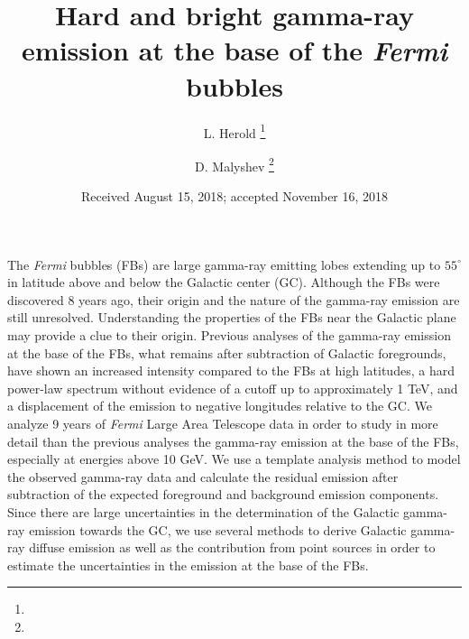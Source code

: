 \documentclass[preprint]{aa}
\newcommand{\Fermi}{\textsl{Fermi}\xspace}
\begin{document}
 


   \title{Hard and bright gamma-ray emission at the base of the \Fermi bubbles}



   \author{L. Herold \thanks{}
          \and
          D. Malyshev \thanks{}
          }


   \date{Received August 15, 2018; accepted November 16, 2018}

 
\abstract
{The \Fermi bubbles (FBs) are large gamma-ray emitting lobes extending up to $55^\circ$ in latitude above and below the Galactic center (GC).
Although the FBs were discovered 8 years ago, their origin and the nature of the gamma-ray emission are still unresolved.
Understanding the properties of the FBs near the Galactic plane may provide a clue to their origin.
Previous analyses of the gamma-ray emission at the base of the FBs, what remains after subtraction of Galactic foregrounds,
have shown an increased intensity compared to the FBs at high latitudes,
a hard power-law spectrum
without evidence of a cutoff up to approximately 1 TeV,
and a displacement of the emission to negative longitudes relative to the GC.
}
{We analyze 9 years of  \Fermi Large Area Telescope data in order to study in more detail than the previous analyses
the gamma-ray emission at the base of the FBs,
especially at energies above 10 GeV.
}
{ We use a template analysis method to model the observed gamma-ray data
and calculate the residual emission after subtraction of the expected foreground and background emission components.
Since there are large uncertainties in the determination of the Galactic gamma-ray emission towards the GC,
we use several methods to derive Galactic gamma-ray diffuse emission as well as the contribution from point sources
in order to estimate the uncertainties in the emission at the base of the FBs.
}
\end{document}
